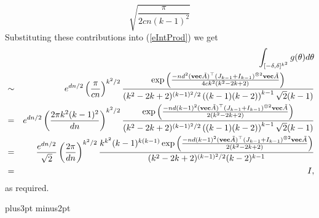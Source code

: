 \documentclass[12pt]{article}
\def\blackslug{\hbox{\kern1pt\vrule height6pt width4pt  depth1pt\kern1pt}}
\def\qed{\penalty 500\hbox{\quad\blackslug}\ifmmode\else\par
                                             \vskip4.5pt plus3pt minus2pt\fi}
\newcommand{\eqn}[1]{(\ref{#1})}
\def\transpose{\top}
\def\mvec{{\bf vec}}
\def\vtheta{{\bf \theta}}
\begin{document}
\[
\sqrt{\frac{\pi}{2cn(k-1)^2}}
\]
Substituting these contributions into \eqn{eIntProd} we get
\begin{eqnarray*}
&&\int_{[-\delta,\delta]^{k^2}} g(\vtheta) d\vtheta\\
&\sim&
e^{dn/2}
\left(\frac{\pi}{cn}\right)^{k^2/2}
\frac{ \exp\left( 
\frac{-nd^2 
(\mvec \tilde A)^\transpose (J_{k-1}+I_{k-1})^{\otimes 2} \mvec \tilde A
}{4ck^2(k^2-2k+2)}
\right) }
{ (k^2-2k+2)^{(k-1)^2/2}
\left((k-1)(k-2)\right)^{k-1}
\sqrt{2}(k-1)}\\
&=&
e^{dn/2}
\left(\frac{2\pi k^2 (k-1)^2}{dn}\right)^{k^2/2}
\frac{ \exp\left( 
\frac{-nd(k-1)^2 
(\mvec \tilde A)^\transpose (J_{k-1}+I_{k-1})^{\otimes 2} \mvec \tilde A
}{2(k^2-2k+2)}
\right) }
{ (k^2-2k+2)^{(k-1)^2/2}
\left((k-1)(k-2)\right)^{k-1}
\sqrt{2}(k-1)}\\
&=&
\frac{e^{dn/2}}{\sqrt{2}}
\left(\frac{2\pi}{dn}\right)^{k^2/2}
\frac{ 
k^{k^2}(k-1)^{k(k-1)}
\exp\left( 
\frac{-nd(k-1)^2 
(\mvec \tilde A)^\transpose (J_{k-1}+I_{k-1})^{\otimes 2} \mvec \tilde A
}{2(k^2-2k+2)}
\right) }
{ (k^2-2k+2)^{(k-1)^2/2}
(k-2)^{k-1} }\\
&=& I,
\end{eqnarray*}
as required.
\qed
\end{document}
